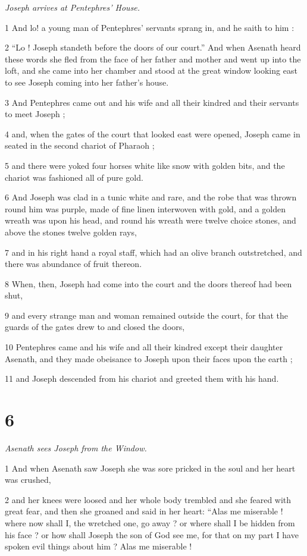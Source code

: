 \textit{Joseph arrives at Pentephres' House.}

1 And lo! a young man of Pentephres' servants sprang in, and he saith to him : 

2 “Lo ! Joseph standeth before the doors of our court.” And when Asenath heard these words she fled from the face of her father and mother and went up into the loft, and she came into her chamber and stood at the great window looking east to see Joseph coming into her father's house. 

3 And Pentephres came out and his wife and all their kindred and their servants to meet Joseph ; 

4 and, when the gates of the court that looked east were opened, Joseph came in seated in the second chariot of Pharaoh ; 

5 and there were yoked four horses white like snow with golden bits, and the chariot was fashioned all of pure gold. 

6 And Joseph was clad in a tunic white and rare, and the robe that was thrown round him was purple, made of fine linen interwoven with gold, and a golden wreath was upon his head, and round his wreath were twelve choice stones, and above the stones twelve golden rays, 

7 and in his right hand a royal staff, which had an olive branch outstretched, and there was abundance of fruit thereon. 

8 When, then, Joseph had come into the court and the doors thereof had been shut, 

9 and every strange man and woman remained outside the court, for that the guards of the gates drew to and closed the doors, 

10 Pentephres came and his wife and all their kindred except their daughter Asenath, and they made obeisance to Joseph upon their faces upon the earth ; 

11 and Joseph descended from his chariot and greeted them with his hand. 

\chapter{6}

\textit{Asenath sees Joseph from the Window.}

1 And when Asenath saw Joseph she was sore pricked in the soul and her heart was crushed, 

2 and her knees were loosed and her whole body trembled and she feared with great fear, and then she groaned and said in her heart: “Alas me miserable ! where now shall I, the wretched one, go away ? or where shall I be hidden from his face ? or how shall Joseph the son of God see me, for that on my part I have spoken evil things about him ? Alas me miserable ! 

